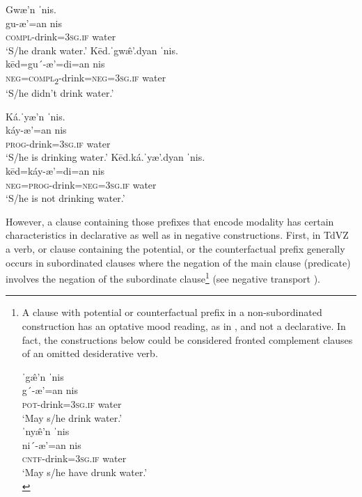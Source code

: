 \documentclass[output=paper,colorlinks=true, citecolor=brown]{langscibook}
\begin{document}
\ea\label{ex:zap:10}
    \ea\label{ex:zap:10a}
        \glll  Gwæ’n ˈnis.\\ 
               gu-æ’=an nis\\
             \textsc{compl}{}-drink=\textsc{3sg.if} water \\
        \glt  ‘S/he drank water.’
    \ex\label{ex:zap:10b}
        \glll Kēd.ˈgw\^{æ}’.dyan ˈnis.\\
             kēd=gu´-æ’=di=an nis\\
               \textsc{neg}=\textsc{compl}\textsc{\textsubscript{2}}{}-drink=\textsc{neg}=\textsc{3sg.if} water\\
        \glt ‘S/he didn’t drink water.’ 
    \z
\z 

\ea\label{ex:zap:11}
    \ea\label{ex:zap:11a}
        \glll  Ká.ˈyæ’n ˈnis.\\ 
               káy-æ’=an nis\\
               \textsc{prog}{}-drink=\textsc{3sg.if} water\\
        \glt  ‘S/he is drinking water.’
    \ex\label{ex:zap:11b}
        \glll  Kēd.ká.ˈyæ’.dyan ˈnis.\\
              kēd=káy-æ’=di=an nis\\
               \textsc{neg}=\textsc{prog}{}-drink=\textsc{neg}=\textsc{3sg.if} water\\
        \glt  ‘S/he is not drinking water.’
    \z
\z 

\largerpage
However, a clause containing those prefixes that encode modality has certain characteristics in declarative as well as in negative constructions. First, in TdVZ a verb, or clause containing the potential, or the counterfactual prefix generally occurs in subordinated clauses where the negation of the main clause (predicate) involves the negation of the subordinate clause\footnote{A clause with potential or counterfactual prefix in a non-subordinated construction has an optative mood reading, as in , and not a declarative. In fact, the constructions below could be considered fronted complement clauses of an omitted desiderative verb.

\ea\label{ex:zap:fn:i}
    \ea\label{ex:zap:fn:ia}
        \glll ˈg\^{æ}’n ˈnis \\
            g´-æ’=an nis \\
            \textsc{pot}{}-drink=\textsc{3sg.if} water \\
        \glt ‘May s/he drink water.’ \\
    \ex\label{ex:zap:fn:ib}
        \glll ˈny\^{æ}’n ˈnis \\
            ni´-æ’=an nis \\
            \textsc{cntf}{}-drink=\textsc{3sg.if} water \\
        \glt ‘May s/he have drunk water.’\\
    \z
\z

} (see negative transport ).
\end{document}
